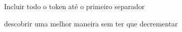 
\begin{DoxyRefList}
\item[\label{todo__todo000001}%
\hypertarget{todo__todo000001}{}%
Membro \hyperlink{lexer_8h_a63ef6d488951c4541159fe0961565c4d}{scanner} (std\-::string line, int $\ast$position)]Incluir todo o token até o primeiro separador 

descobrir uma melhor maneira sem ter que decrementar 
\end{DoxyRefList}